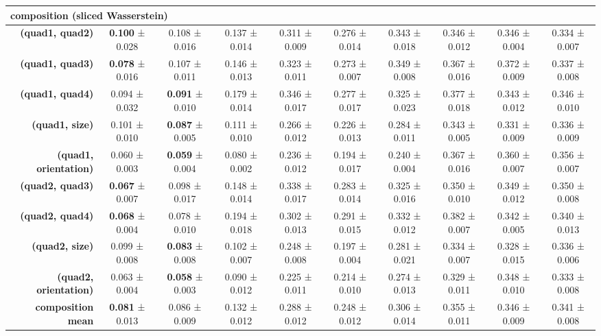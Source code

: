 \begin{tabular}{rccccccccc}
\midrule
\multicolumn{ 10 }{l}{\textbf{composition}  (sliced Wasserstein)} \\
\midrule
\textbf{(quad1, quad2)} & \textbf{0.100} ± 0.028 & 0.108 ± 0.016 & 0.137 ± 0.014 & 0.311 ± 0.009 & 0.276 ± 0.014 & 0.343 ± 0.018 & 0.346 ± 0.012 & 0.346 ± 0.004 & 0.334 ± 0.007 \\
\textbf{(quad1, quad3)} & \textbf{0.078} ± 0.016 & 0.107 ± 0.011 & 0.146 ± 0.013 & 0.323 ± 0.011 & 0.273 ± 0.007 & 0.349 ± 0.008 & 0.367 ± 0.016 & 0.372 ± 0.009 & 0.337 ± 0.008 \\
\textbf{(quad1, quad4)} & 0.094 ± 0.032 & \textbf{0.091} ± 0.010 & 0.179 ± 0.014 & 0.346 ± 0.017 & 0.277 ± 0.017 & 0.325 ± 0.023 & 0.377 ± 0.018 & 0.343 ± 0.012 & 0.346 ± 0.010 \\
\textbf{(quad1, size)} & 0.101 ± 0.010 & \textbf{0.087} ± 0.005 & 0.111 ± 0.010 & 0.266 ± 0.012 & 0.226 ± 0.013 & 0.284 ± 0.011 & 0.343 ± 0.005 & 0.331 ± 0.009 & 0.336 ± 0.009 \\
\textbf{(quad1, orientation)} & 0.060 ± 0.003 & \textbf{0.059} ± 0.004 & 0.080 ± 0.002 & 0.236 ± 0.012 & 0.194 ± 0.017 & 0.240 ± 0.004 & 0.367 ± 0.016 & 0.360 ± 0.007 & 0.356 ± 0.007 \\
\textbf{(quad2, quad3)} & \textbf{0.067} ± 0.007 & 0.098 ± 0.017 & 0.148 ± 0.014 & 0.338 ± 0.017 & 0.283 ± 0.014 & 0.325 ± 0.016 & 0.350 ± 0.010 & 0.349 ± 0.012 & 0.350 ± 0.008 \\
\textbf{(quad2, quad4)} & \textbf{0.068} ± 0.004 & 0.078 ± 0.010 & 0.194 ± 0.018 & 0.302 ± 0.013 & 0.291 ± 0.015 & 0.332 ± 0.012 & 0.382 ± 0.007 & 0.342 ± 0.005 & 0.340 ± 0.013 \\
\textbf{(quad2, size)} & 0.099 ± 0.008 & \textbf{0.083} ± 0.008 & 0.102 ± 0.007 & 0.248 ± 0.008 & 0.197 ± 0.004 & 0.281 ± 0.021 & 0.334 ± 0.007 & 0.328 ± 0.015 & 0.336 ± 0.006 \\
\textbf{(quad2, orientation)} & 0.063 ± 0.004 & \textbf{0.058} ± 0.003 & 0.090 ± 0.012 & 0.225 ± 0.011 & 0.214 ± 0.010 & 0.274 ± 0.013 & 0.329 ± 0.011 & 0.348 ± 0.010 & 0.333 ± 0.008 \\
\addlinespace
\textbf{composition mean} & \textbf{0.081} ± 0.013 & 0.086 ± 0.009 & 0.132 ± 0.012 & 0.288 ± 0.012 & 0.248 ± 0.012 & 0.306 ± 0.014 & 0.355 ± 0.011 & 0.346 ± 0.009 & 0.341 ± 0.008 \\
\midrule
\bottomrule
\end{tabular}